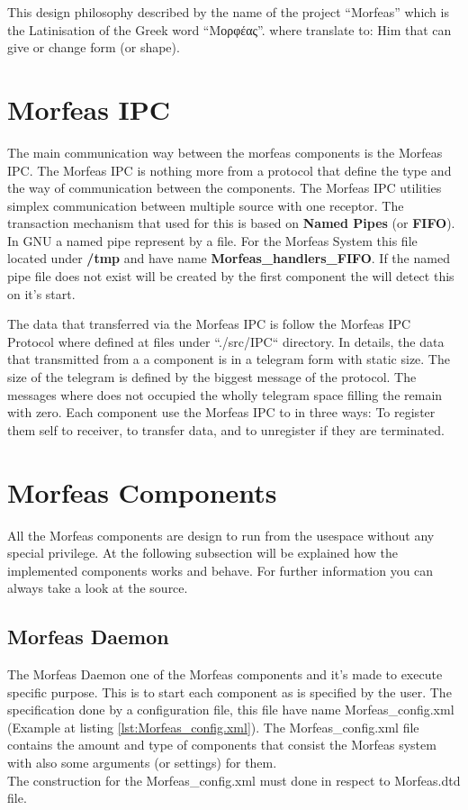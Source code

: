 \documentclass{article}
\begin{document}
This design philosophy described by the name of the project ``Morfeas'' which is the Latinisation of the Greek word
``Μορφέας''. where translate to: Him that can give or change form (or shape).

\section{Morfeas IPC}
The main communication way between the morfeas components is the Morfeas IPC. The Morfeas IPC is nothing more from a protocol that define the type and
the way of communication between the components. The Morfeas IPC utilities simplex communication between multiple source with one receptor.
The transaction mechanism that used for this is based on \textbf{Named Pipes} (or \textbf{FIFO}). In GNU a named pipe represent by a file.
For the Morfeas System this file located under \textbf{/tmp} and have name \textbf{Morfeas\_handlers\_FIFO}.
If the named pipe file does not exist will be created by the first component the will detect this on it's start.

The data that transferred via the Morfeas IPC is follow the Morfeas IPC Protocol where defined at files under ``./src/IPC`` directory.
In details, the data that transmitted from a a component is in a telegram form with static size.
The size of the telegram is defined by the biggest message of the protocol. The messages where does not occupied the wholly telegram space filling the remain with zero.
Each component use the Morfeas IPC to in three ways: To register them self to receiver, to transfer data, and to unregister if they are terminated.

\section{Morfeas Components}
All the Morfeas components are design to run from the usespace without any special privilege.
At the following subsection will be explained how the implemented components works and behave. For further information you can always take a look at the source.

\subsection{Morfeas Daemon}
The Morfeas Daemon one of the Morfeas components and it's made to execute specific purpose. This is to start each component as is specified by the user.
The specification done by a configuration file, this file have name Morfeas\_config.xml (Example at listing \ref{lst:Morfeas_config.xml}).
The Morfeas\_config.xml file contains the amount and type of components that consist the Morfeas system with also some arguments (or settings) for them.\\
The construction for the Morfeas\_config.xml must done in respect to Morfeas.dtd file. 
\end{document}
